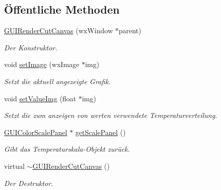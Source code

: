 \subsection*{Öffentliche Methoden}
\begin{DoxyCompactItemize}
\item 
\hyperlink{classGUIRenderCutCanvas_aa61de910b5041f7384def30e55b0817e}{G\-U\-I\-Render\-Cut\-Canvas} (wx\-Window $\ast$parent)
\begin{DoxyCompactList}\small\item\em Der Konstruktor. \end{DoxyCompactList}\item 
void \hyperlink{classGUIRenderCutCanvas_ab20c8e437704facc41fa8c3c111ffa85}{set\-Image} (wx\-Image $\ast$img)
\begin{DoxyCompactList}\small\item\em Setzt die aktuell angezeigte Grafik. \end{DoxyCompactList}\item 
void \hyperlink{classGUIRenderCutCanvas_a88c49bc069d6e1a40b68dcfce8fd9bf7}{set\-Value\-Img} (float $\ast$img)
\begin{DoxyCompactList}\small\item\em Setzt die zum anzeigen von werten verwendete Temperaturverteilung. \end{DoxyCompactList}\item 
\hyperlink{classGUIColorScalePanel}{G\-U\-I\-Color\-Scale\-Panel} $\ast$ \hyperlink{classGUIRenderCutCanvas_a3f1bece4366e82377ec3754921351929}{get\-Scale\-Panel} ()
\begin{DoxyCompactList}\small\item\em Gibt das Temperaturskala-\/\-Objekt zurück. \end{DoxyCompactList}\item 
virtual \hyperlink{classGUIRenderCutCanvas_a015523000fb4d5d9a5319115d8c3d9bb}{$\sim$\-G\-U\-I\-Render\-Cut\-Canvas} ()
\begin{DoxyCompactList}\small\item\em Der Destruktor. \end{DoxyCompactList}\end{DoxyCompactItemize}
